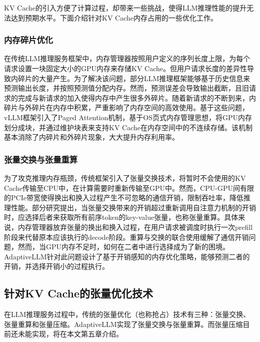 KV Cache的引入方便了计算过程，却带来一些挑战，使得LLM推理性能的提升无法达到预期水平。下面介绍针对KV Cache内存占用的一些优化工作。

\subsubsection{内存碎片优化}

在传统LLM推理服务框架\cite{Swapping}中，内存管理器按照用户定义的序列长度上限，为每个请求设置一块固定大小的GPU内存来存储KV Cache。但用户请求长度的差异性导致内碎片的大量产生。为了解决该问题，部分LLM推理框架\cite{Output-Length-Prediction}能够基于历史信息来预测输出长度，并按照预测值分配内存。然而，预测误差会导致输出截断，且旧请求的完成与新请求的加入使得内存中产生很多外碎片。随着新请求的不断到来，内碎片与外碎片在内存中积累，严重影响了内存空间的高效使用。基于这些问题，vLLM框架\cite{vLLM}引入了Paged Attention机制，基于OS页式内存管理思想，将GPU内存划分成块，并通过维护块表来支持KV Cache在内存空间中的不连续存储。该机制基本消除了内碎片和外碎片现象，大大提升内存利用率。

\subsubsection{张量交换与张量重算}

为了攻克推理内存瓶颈，传统框架引入了张量交换技术\cite{Swapping, vLLM, LightLLM}，将暂时不会使用的KV Cache传输至CPU中，在计算需要时重新传输至GPU中。然而，CPU-GPU间有限的PCIe带宽使得换出和换入过程产生不可忽略的通信开销，限制吞吐率，降低推理性能。部分研究提出\cite{Recomputation}，当张量交换带来的开销超过重新调用自注意力机制的开销时，应选择后者来获取所有前序token的key-value张量，也称张量重算。具体来说，内存管理器放弃张量的换出和换入过程，在用户请求被调度时执行一次prefill阶段来代替原本应该执行的decode阶段。重算与交换的联合使用缓解了通信开销问题，然而，当GPU内存不足时，如何在二者中进行选择成为了新的困境。AdaptiveLLM针对此问题设计了基于开销感知的内存优化策略，能够预测二者的开销，并选择开销小的过程执行。

\subsection{针对KV Cache的张量优化技术}

在LLM推理服务过程中，传统的张量优化（也称抢占）技术有三种：张量交换、张量重算和张量压缩\cite{Swapping}。AdaptiveLLM实现了张量交换与张量重算。而张量压缩目前还未能实现，将在本文第五章介绍。

